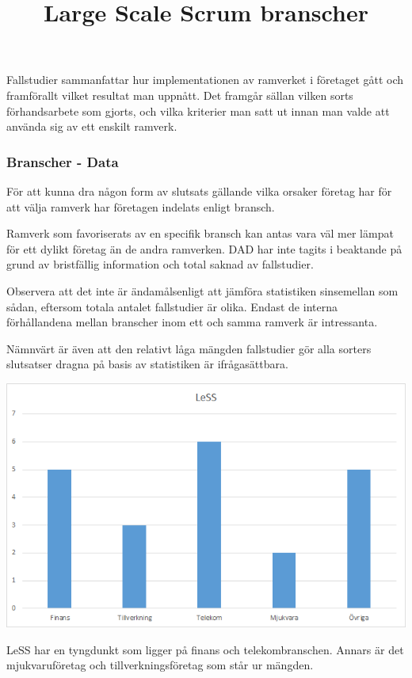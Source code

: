 		Fallstudier sammanfattar hur implementationen av ramverket i företaget gått och framförallt vilket resultat man uppnått. Det framgår sällan vilken sorts förhandsarbete som gjorts, och vilka kriterier man satt ut innan man valde att använda sig av ett enskilt ramverk.
		
		\subsubsection{Branscher - Data}
			
			För att kunna dra någon form av slutsats gällande vilka orsaker företag har för att välja ramverk har företagen indelats enligt bransch.
					
			Ramverk som favoriserats av en specifik bransch kan antas vara väl mer lämpat för ett dylikt företag än de andra ramverken. DAD har inte tagits i beaktande på grund av bristfällig information och total saknad av fallstudier.
			
			Observera att det inte är ändamålsenligt att jämföra statistiken sinsemellan som sådan, eftersom totala antalet fallstudier är olika. Endast de interna förhållandena mellan branscher inom ett och samma ramverk är intressanta.
				
			Nämnvärt är även att den relativt låga mängden fallstudier gör alla sorters slutsatser dragna på basis av statistiken är ifrågasättbara.
			
			\title{Large Scale Scrum branscher}
			\begin{center}
				\includegraphics{Grafer/LeSS_brancher.png}
			\end{center}
		
			LeSS har en tyngdunkt som ligger på finans och telekombranschen. Annars är det mjukvaruföretag och tillverkningsföretag som står ur mängden.\\		
				
